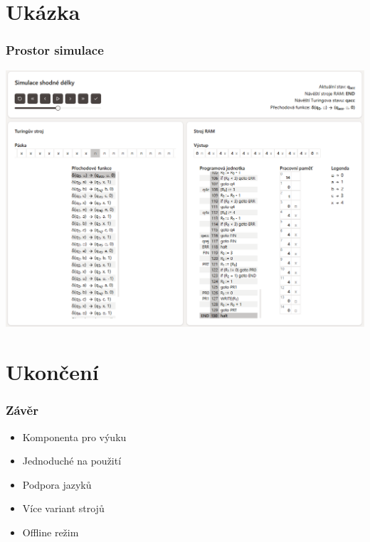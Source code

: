 \documentclass{beamer}
\begin{document}
\section{Ukázka}
\begin{frame}
	\frametitle{Prostor simulace}
    \vspace{-2.6mm}
    \begin{center}
        \includegraphics[height=0.913\textheight]{fig/obr4.png}
    \end{center}
\end{frame}

\section{Ukončení}
\begin{frame}
	\frametitle{Závěr}
	\begin{itemize}
		\item<1-> Komponenta pro výuku
	\end{itemize}
    \bigskip
    \begin{itemize}
		\item<1-> Jednoduché na použití
	\end{itemize}
    \bigskip
    \begin{itemize}
		\item<1-> Podpora jazyků
        \item<1-> Více variant strojů
        \item<1-> Offline režim
	\end{itemize}
    \bigskip
    \bigskip
\end{frame}
\end{document}
